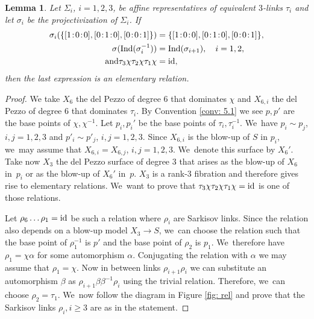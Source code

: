 \documentclass[JEP,XML,SOM,Unicode,NoFloatCountersInSection, NoEqCountersInSection,published]{cedram}
\newcommand{\id}{\textup{id}}
\newcommand{\Ind}{\textup{Ind}}
\newcommand{\sep}{\mkern2mu{:}\mkern2mu}
\newtheorem{lemma}[theorem]{Lemma}
\theoremstyle{definition}
\begin{document}
\begin{lemma}\label{ElemRel}
Let $\Sigma_i$, $i=1,2,3$, be affine representatives of equivalent $3$\nobreakdash-links $\tau_i$ and let $\sigma_i$ be the projectivization of $\Sigma_i$. If
\begin{align*}
\sigma_i(\{[1\sep 0\sep 0],[0\sep 1\sep 0],[0\sep 0\sep 1] \}) &= \{[1\sep 0\sep 0],[0\sep 1\sep 0],[0\sep 0\sep 1] \},
\\
\sigma (\Ind(\sigma_{i}^{-1})) &= \Ind(\sigma_{i+1}), \quad i=1,2,
\\
\tag*{and}
\tau_3 \chi \tau_2 \chi \tau_1 \chi &= \id,
\end{align*}
then the last expression is an elementary relation.
\end{lemma}

\begin{proof}
We take $X_6$ the del Pezzo of degree $6$ that dominates $\chi$ and $X_{6,i}$ the del Pezzo of degree $6$ that dominates $\tau_i$. By Convention \ref{conv: 5.1} we see $p,p'$ are the base points of $\chi, \chi^{-1}$. Let $p_i,p_i'$ be the base points of $\tau_i, \tau_i^{-1}$. We~have $p_i \sim p_j$, $i,j = 1,2,3$ and $p'_i \sim p'_j$, $i,j = 1,2,3$. Since $X_{6,i}$ is the blow-up of $S$ in $p_i$, we~may assume that $X_{6,i} = X_{6,j}$, $i,j = 1,2,3$. We~denote this surface by $X_6'$. Take now $X_3$ the del Pezzo surface of degree $3$ that arises as the blow-up of $X_6$ in~$p_i$ or as the blow-up of $X_6'$ in~$p$. $X_3$ is a rank-$3$ fibration and therefore gives rise to elementary relations. We~want to prove that $\tau_3 \chi \tau_2 \chi \tau_1 \chi = \id$ is one of those relations.

Let $\rho_6 \dots \rho_1 = \id$ be such a relation where $\rho_i$ are Sarkisov links. Since the relation also depends on a blow-up model $X_3 \to S$, we~can choose the relation such that the base point of $\rho_1^{-1}$ is $p'$ and the base point of $\rho_2$ is $p_1$. We~therefore have $\rho_1 = \chi \alpha$ for some automorphism $\alpha$. Conjugating the relation with $\alpha$ we may assume that $\rho_1 = \chi$. Now in between links $\rho_{i + 1} \rho_i$ we can substitute an automorphism $\beta$ as $\rho_{i + 1} \beta \beta^{-1} \rho_i$ using the trivial relation. Therefore, we~can choose $\rho_2 = \tau_1$. We~now follow the diagram in Figure \ref{fig: rel} and prove that the Sarkisov links $\rho_i, i \geq 3$ are as in the statement.


\end{proof}
\end{document}
